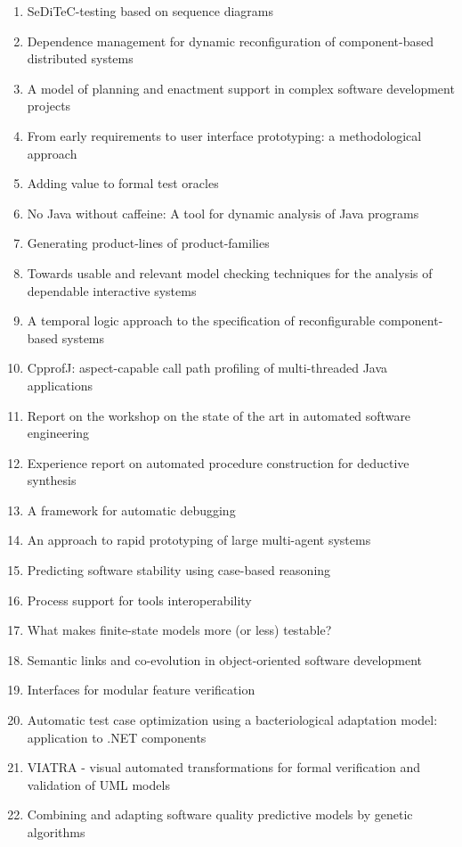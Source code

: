 \begin{enumerate}[itemsep=-1ex]
  \item SeDiTeC-testing based on sequence diagrams
  \item Dependence management for dynamic reconfiguration of component-based distributed systems
  \item A model of planning and enactment support in complex software development projects
  \item From early requirements to user interface prototyping: a methodological approach
  \item Adding value to formal test oracles
  \item No Java without caffeine: A tool for dynamic analysis of Java programs
  \item Generating product-lines of product-families
  \item Towards usable and relevant model checking techniques for the analysis of dependable interactive systems
  \item A temporal logic approach to the specification of reconfigurable component-based systems
  \item CpprofJ: aspect-capable call path profiling of multi-threaded Java applications
  \item Report on the workshop on the state of the art in automated software engineering
  \item Experience report on automated procedure construction for deductive synthesis
  \item A framework for automatic debugging
  \item An approach to rapid prototyping of large multi-agent systems
  \item Predicting software stability using case-based reasoning
  \item Process support for tools interoperability
  \item What makes finite-state models more (or less) testable?
  \item Semantic links and co-evolution in object-oriented software development
  \item Interfaces for modular feature verification
  \item Automatic test case optimization using a bacteriological adaptation model: application to .NET components
  \item VIATRA - visual automated transformations for formal verification and validation of UML models
  \item Combining and adapting software quality predictive models by genetic algorithms

\end{enumerate}
